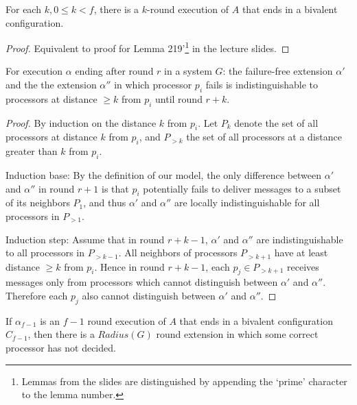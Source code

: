 \begin{lemma}
For each $k, 0 \leq k < f$, there is a $k$-round execution of $A$ that ends in
a bivalent configuration.
\end{lemma}

\begin{proof}
Equivalent to proof for Lemma 219'\footnote{Lemmas from the slides are
distinguished by appending the `prime' character to the lemma number.} 
in the lecture slides.
\end{proof}

\begin{lemma} \label{lemma:indist_dist}
For execution $\alpha$ ending after round $r$ in a system $G$: the failure-free
extension $\alpha'$ and the the extension $\alpha''$ in which
processor $p_i$ fails is indistinguishable to processors at distance $\geq k$ from
$p_i$ until round $r+k$.
\end{lemma}

\begin{proof}
By induction on the distance $k$ from $p_i$. Let $P_k$ denote the set of
all processors at distance $k$ from $p_i$, and $P_{>k}$ the set of all
processors at a distance greater than $k$ from $p_i$.

Induction base: By the definition of our model, the only difference 
between $\alpha'$ and $\alpha''$ in round $r+1$ is that $p_i$ potentially fails
to deliver messages to a subset of its neighbors $P_1$, and thus $\alpha'$ and $\alpha''$
are locally indistinguishable for all processors in $P_{>1}$.

Induction step: Assume that in round $r+k-1$, $\alpha'$ and $\alpha''$ are
indistinguishable to all processors in $P_{>k-1}$. 
All neighbors of processors $P_{>k+1}$ have at least distance $\geq k$
from $p_i$. Hence in round $r+k-1$, each $p_j \in P_{>k+1}$ receives messages
only from processors which cannot distinguish between $\alpha'$ and $\alpha''$.
Therefore each $p_j$ also cannot distinguish between $\alpha'$ and $\alpha''$.
\end{proof}


\begin{lemma}
If $\alpha_{f-1}$ is an $f-1$ round execution of $A$ that ends in a bivalent
configuration $C_{f-1}$, then there is a $Radius(G)$ round extension in which
some correct processor has not decided.
\end{lemma}

